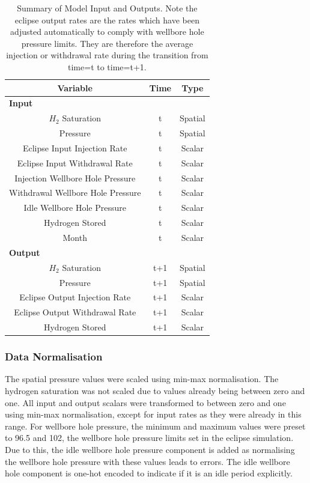 \begin{table}[H]
    \centering
    \begin{tabular}{ccc}
    \toprule
    \textbf{Variable} & \textbf{Time} & \textbf{Type} \\
    \midrule
    \multicolumn{3}{l}{\textbf{Input}} \\
    \midrule
        $H_2$ Saturation & t & Spatial \\
         Pressure & t & Spatial \\
         Eclipse Input Injection Rate & t & Scalar \\
         Eclipse Input Withdrawal Rate & t & Scalar\\
         Injection Wellbore Hole Pressure & t & Scalar\\
         Withdrawal Wellbore Hole Pressure & t & Scalar\\
         Idle Wellbore Hole Pressure & t & Scalar \\
         Hydrogen Stored & t & Scalar\\
         Month & t & Scalar\\
    \midrule
    \multicolumn{3}{l}{\textbf{Output}} \\
    \midrule
    $H_2$ Saturation & t+1 & Spatial \\
     Pressure & t+1 & Spatial \\
     Eclipse Output Injection Rate & t+1 & Scalar \\
     Eclipse Output Withdrawal Rate & t+1 & Scalar\\
     Hydrogen Stored & t+1 & Scalar \\
     \bottomrule
    \end{tabular}
    \caption{Summary of Model Input and Outputs. Note the eclipse output rates are the rates which have been adjusted automatically to comply with wellbore hole pressure limits. They are therefore the average injection or withdrawal rate during the transition from time=t to time=t+1.}
    \label{tab:model_inputs_outputs}
\end{table}

\subsubsection{Data Normalisation}
The spatial pressure values were scaled using min-max normalisation. The hydrogen saturation was not scaled due to values already being between zero and one. All input and output scalars were transformed to between zero and one using min-max normalisation, except for input rates as they were already in this range. For wellbore hole pressure, the minimum and maximum values were preset to 96.5 and 102, the wellbore hole pressure limits set in the eclipse simulation. Due to this, the idle wellbore hole pressure component is added as normalising the wellbore hole pressure with these values leads to errors. The idle wellbore hole component is one-hot encoded to indicate if it is an idle period explicitly. 

